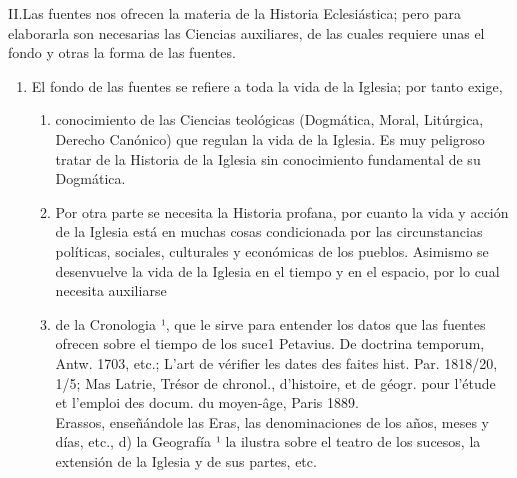 \raggedbottom{} \documentclass[12pt, a4paper]{book}
\begin{document}
II.\@ Las fuentes nos ofrecen la materia de la Historia Eclesiástica; pero para elaborarla son necesarias las Ciencias auxiliares, de las cuales requiere unas el fondo y otras la forma de las fuentes.
\begin{enumerate}
  \item El fondo de las fuentes se refiere a toda la vida de la Iglesia;
        por tanto exige,\begin{enumerate}
          \item conocimiento de las Ciencias teológicas (Dogmática, Moral, Litúrgica, Derecho Canónico) que regulan la vida de la Iglesia. Es muy peligroso tratar de la Historia de la Iglesia sin conocimiento fundamental de su Dogmática.
          \item Por otra parte se necesita la Historia profana, por cuanto la vida y acción de la Iglesia está en muchas cosas condicionada por las circunstancias políticas, sociales, culturales y económicas de los pueblos. Asimismo se desenvuelve la vida de la Iglesia en el tiempo y en el espacio, por lo cual necesita auxiliarse
          \item de la Cronologia ¹, que le sirve para entender los datos que las fuentes ofrecen sobre el tiempo de los suce1 Petavius. De doctrina temporum, Antw. 1703, etc.; L'art de vérifier les dates des faites hist. Par. 1818/20, 1/5; Mas Latrie, Trésor de chronol., d'histoire, et de géogr. pour l'étude et l'emploi des docum. du moyen-âge, Paris 1889.\\ Erassos, enseñándole las Eras, las denominaciones de los años, meses y días, etc., d) la Geografía ¹ la ilustra sobre el teatro de los sucesos, la extensión de la Iglesia y de sus partes, etc.



\end{enumerate}
\end{enumerate}
\end{document}
